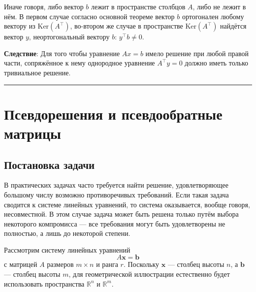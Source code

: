 \documentclass[11pt,a4paper]{article}
\begin{document}
Иначе говоря, либо вектор \(b\) лежит в пространстве столбцов \(A\),
либо не лежит в нём. В первом случае согласно основной теореме вектор
\(b\) ортогонален любому вектору из \(\mathrm{Ker}(A^\top)\), во-втором
же случае в пространстве \(\mathrm{Ker}(A^\top)\) найдётся вектор \(y\),
неортогональный вектору \(b\): \(y^\top b \ne 0\).

\textbf{Следствие}: Для того чтобы уравнение \(Ax=b\) имело решение при
любой правой части, сопряжённое к нему однородное уравнение
\(A^\top y = 0\) должно иметь только тривиальное решение.

    \begin{center}\rule{0.5\linewidth}{0.5pt}\end{center}

    \hypertarget{ux43fux441ux435ux432ux434ux43eux440ux435ux448ux435ux43dux438ux44f-ux438-ux43fux441ux435ux432ux434ux43eux43eux431ux440ux430ux442ux43dux44bux435-ux43cux430ux442ux440ux438ux446ux44b}{%
\section{Псевдорешения и псевдообратные
матрицы}\label{ux43fux441ux435ux432ux434ux43eux440ux435ux448ux435ux43dux438ux44f-ux438-ux43fux441ux435ux432ux434ux43eux43eux431ux440ux430ux442ux43dux44bux435-ux43cux430ux442ux440ux438ux446ux44b}}

    \hypertarget{ux43fux43eux441ux442ux430ux43dux43eux432ux43aux430-ux437ux430ux434ux430ux447ux438}{%
\subsection{Постановка
задачи}\label{ux43fux43eux441ux442ux430ux43dux43eux432ux43aux430-ux437ux430ux434ux430ux447ux438}}

В практических задачах часто требуется найти решение, удовлетворяющее
большому числу возможно противоречивых требований. Если такая задача
сводится к системе линейных уравнений, то система оказывается, вообще
говоря, несовместной. В этом случае задача может быть решена только
путём выбора некоторого компромисса --- все требования могут быть
удовлетворены не полностью, а лишь до некоторой степени.

Рассмотрим систему линейных уравнений
\[
  A\mathbf{x} = \mathbf{b} \tag{1}\label{eq:system}
\]
с матрицей \(A\) размеров \(m \times n\) и ранга \(r\). Поскольку
\(\mathbf{x}\) --- столбец высоты \(n\), а \(\mathbf{b}\) --- столбец
высоты \(m\), для геометрической иллюстрации естественно будет
использовать пространства \(\mathbb{R}^n\) и \(\mathbb{R}^m\).
\end{document}
